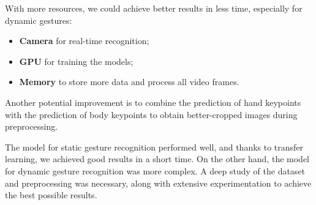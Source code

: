 \documentclass[10pt,twocolumn,letterpaper]{article}
\begin{document}
With more resources, we could achieve better results in less time, especially for dynamic gestures:  
\begin{itemize}  
   \item \textbf{Camera} for real-time recognition;  
   \item \textbf{GPU} for training the models;  
   \item \textbf{Memory} to store more data and process all video frames.  
\end{itemize}  

Another potential improvement is to combine the prediction of hand keypoints with the prediction of body keypoints to obtain better-cropped images during preprocessing.  

The model for static gesture recognition performed well, and thanks to transfer learning, we achieved good results in a short time. On the other hand, the model for dynamic gesture recognition was more complex. A deep study of the dataset and preprocessing was necessary, along with extensive experimentation to achieve the best possible results.  

{\small


}
\end{document}

